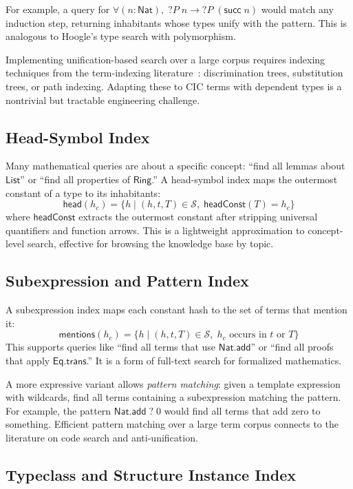 \documentclass[11pt]{article}
\theoremstyle{definition}
\theoremstyle{plain}
\theoremstyle{remark}
\newcommand{\hashset}{\mathcal{S}}
\newcommand{\Nat}{\textsf{Nat}}
\begin{document}
For example, a query for $\forall (n : \Nat),\; ?P\;n \to ?P\;(\textsf{succ}\;n)$
would match any induction step, returning inhabitants whose types unify with the pattern.
This is analogous to Hoogle's type search with polymorphism.

Implementing unification-based search over a large corpus requires indexing techniques
from the term-indexing literature~\cite{graf1996}: discrimination trees, substitution trees,
or path indexing.
Adapting these to CIC terms with dependent types is a nontrivial but tractable
engineering challenge.

\subsection{Head-Symbol Index}
\label{sec:head-index}

Many mathematical queries are about a specific concept: ``find all lemmas about $\textsf{List}$''
or ``find all properties of $\textsf{Ring}$.''
A head-symbol index maps the outermost constant of a type to its inhabitants:
\[
  \textsf{head}(h_c) = \{ h \mid (h, t, T) \in \hashset,\; \textsf{headConst}(T) = h_c \}
\]
where $\textsf{headConst}$ extracts the outermost constant after stripping universal
quantifiers and function arrows.
This is a lightweight approximation to concept-level search, effective for browsing
the knowledge base by topic.

\subsection{Subexpression and Pattern Index}
\label{sec:subexpr-index}

A subexpression index maps each constant hash to the set of terms that mention it:
\[
  \textsf{mentions}(h_c) = \{ h \mid (h, t, T) \in \hashset,\; h_c \text{ occurs in } t \text{ or } T \}
\]
This supports queries like ``find all terms that use $\textsf{Nat.add}$'' or
``find all proofs that apply $\textsf{Eq.trans}$.''
It is a form of full-text search for formalized mathematics.

A more expressive variant allows \emph{pattern matching}: given a template expression
with wildcards, find all terms containing a subexpression matching the pattern.
For example, the pattern $\textsf{Nat.add}\;?\;0$ would find all terms that add zero
to something.
Efficient pattern matching over a large term corpus connects to the literature
on code search and anti-unification.

\subsection{Typeclass and Structure Instance Index}
\label{sec:instance-index}
\end{document}

